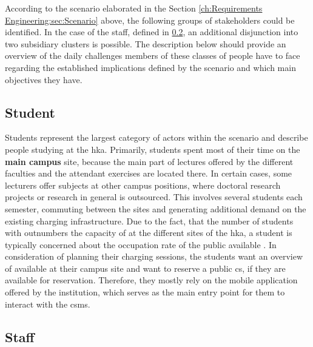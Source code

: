 According to the scenario elaborated in the Section \ref{ch:Requirements Engineering:sec:Scenario} above, the following groups of stakeholders could be identified. 
In the case of the staff, defined in \ref{ch:Requirements Engineering:sec:Stakeholders:ssec:Staff}, an additional disjunction into two subsidiary clusters is possible. 
The description below should provide an overview of the daily challenges members of these classes of people have to face regarding the established implications defined by the scenario and which main objectives they have. 

\subsection{Student}
\label{ch:Requirements Engineering:sec:Stakeholders:ssec:Student}

Students represent the largest category of actors within the scenario and describe people studying at the \acrshort{hka}. Primarily, students spent most of their time on the \textbf{main campus} site, because the main part of lectures offered by the different faculties and the attendant exercises are located there.
In certain cases, some lecturers offer subjects at other campus positions, where doctoral research projects or research in general is outsourced. This involves several students each semester, commuting between the sites and generating additional demand on the existing charging infrastructure.
Due to the fact, that the number of students with  outnumbers the capacity of  at the different sites of the \acrshort{hka}, a student is typically concerned about the occupation rate of the public available .
In consideration of planning their charging sessions, the students want an overview of available  at their campus site and want to reserve a public \acrshort{cs}, if they are available for reservation.
Therefore, they mostly rely on the mobile application offered by the institution, which serves as the main entry point for them to interact with the \acrshort{csms}. 

\subsection{Staff}
\label{ch:Requirements Engineering:sec:Stakeholders:ssec:Staff}

